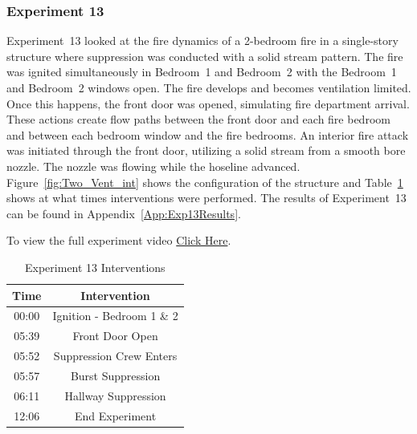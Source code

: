 \documentclass[12pt,oneside]{book}
\begin{document}
\FloatBarrier

\subsubsection{Experiment 13}
Experiment~13 looked at the fire dynamics of a 2-bedroom fire in a single-story structure where suppression was conducted with a solid stream pattern. The fire was ignited simultaneously in Bedroom~1 and Bedroom~2 with the Bedroom~1 and Bedroom~2 windows open. The fire develops and becomes ventilation limited. Once this happens, the front door was opened, simulating fire department arrival. These actions create flow paths between the front door and each fire bedroom and between each bedroom window and the fire bedrooms. An interior fire attack was initiated through the front door, utilizing a solid stream from a smooth bore nozzle. The nozzle was flowing while the hoseline advanced. Figure~\ref{fig:Two_Vent_int} shows the configuration of the structure and Table~\ref{Table:Exp13Interventions} shows at what times interventions were performed. The results of Experiment~13 can be found in Appendix~\ref{App:Exp13Results}. 

To view the full experiment video \href{https://player.vimeo.com/video/170499618?autoplay=1}{Click Here}.

\begin{table}[H]
	\centering
	\caption{Experiment 13 Interventions}
	\begin{tabular}{|c|c|} 
		\hline
		Time & Intervention \\ \hline \hline
		00:00 & Ignition - Bedroom 1 \& 2 \\ \hline
		05:39 & Front Door Open \\ \hline
		05:52 & Suppression Crew Enters\\ \hline
		05:57 & Burst Suppression \\ \hline 
		06:11 & Hallway Suppression \\ \hline
		12:06 & End Experiment\\ \hline
	\end{tabular}
	\label{Table:Exp13Interventions}
\end{table}

\FloatBarrier
\end{document}
